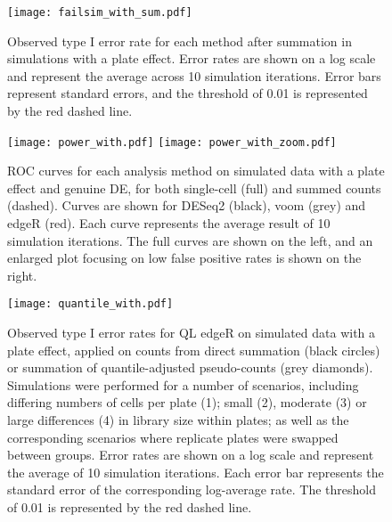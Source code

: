\documentclass[oupdraft]{bio}
\begin{document}
\begin{figure}[!p]
\begin{center}
\texttt{[image: failsim\_with\_sum.pdf]}
\end{center}
\caption{
    Observed type I error rate for each method after summation in simulations with a plate effect.
    Error rates are shown on a log scale and represent the average across 10 simulation iterations.
    Error bars represent standard errors, and the threshold of 0.01 is represented by the red dashed line.
}
\label{fig:platesum}
\end{figure}

\begin{figure}[!p]
\begin{center}
\texttt{[image: power\_with.pdf]}
\texttt{[image: power\_with\_zoom.pdf]}
\end{center}
\caption{
    ROC curves for each analysis method on simulated data with a plate effect and genuine DE, for both single-cell (full) and summed counts (dashed).
    Curves are shown for DESeq2 (black), voom (grey) and edgeR (red).
    Each curve represents the average result of 10 simulation iterations.
    The full curves are shown on the left, and an enlarged plot focusing on low false positive rates is shown on the right.
}
\label{fig:roc}
\end{figure}

\begin{figure}[!p]
\begin{center}
\texttt{[image: quantile\_with.pdf]}
\end{center}
\caption{
    Observed type I error rates for QL edgeR on simulated data with a plate effect, 
        applied on counts from direct summation (black circles) or summation of quantile-adjusted pseudo-counts (grey diamonds). 
    Simulations were performed for a number of scenarios, including differing numbers of cells per plate (1);
        small (2), moderate (3) or large differences (4) in library size within plates;
        as well as the corresponding scenarios where replicate plates were swapped between groups.
    Error rates are shown on a log scale and represent the average of 10 simulation iterations.
    Each error bar represents the standard error of the corresponding log-average rate.
    The threshold of 0.01 is represented by the red dashed line.
}
\label{fig:complexplate}
\end{figure}
\end{document}
